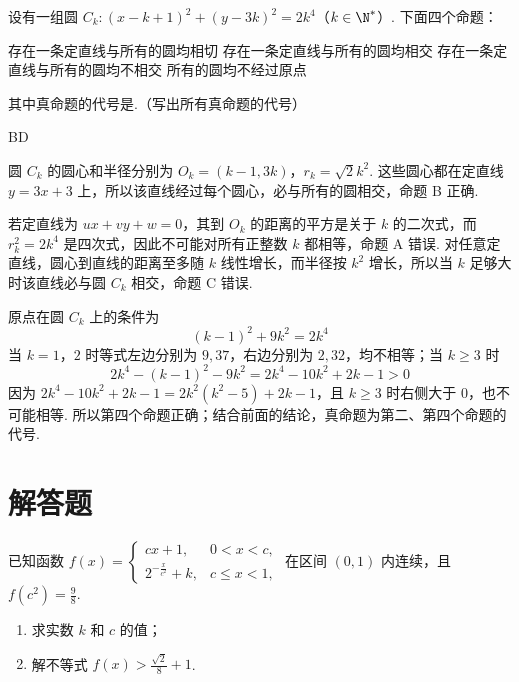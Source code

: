 \begin{problem}
设有一组圆 \(C_k: (x - k + 1)^{2} + (y - 3k)^{2} = 2k^{4}\)（\(k \in \N^*\)）. 下面四个命题：

\choices
    {存在一条定直线与所有的圆均相切}
    {存在一条定直线与所有的圆均相交}
    {存在一条定直线与所有的圆均不相交}
    {所有的圆均不经过原点}

其中真命题的代号是\fillinblank{}.（写出所有真命题的代号）
\end{problem}

\begin{answer}
BD
\end{answer}

\begin{solution}
圆 \(C_k\) 的圆心和半径分别为
\(O_k=(k-1,3k)\)，\(r_k=\sqrt2 k^2\).
这些圆心都在定直线 \(y=3x+3\) 上，所以该直线经过每个圆心，必与所有的圆相交，命题 B 正确.

若定直线为 \(ux+vy+w=0\)，其到 \(O_k\) 的距离的平方是关于 \(k\) 的二次式，而 \(r_k^2=2k^4\) 是四次式，因此不可能对所有正整数 \(k\) 都相等，命题 A 错误. 对任意定直线，圆心到直线的距离至多随 \(k\) 线性增长，而半径按 \(k^2\) 增长，所以当 \(k\) 足够大时该直线必与圆 \(C_k\) 相交，命题 C 错误.

原点在圆 \(C_k\) 上的条件为
\[
(k-1)^2+9k^2=2k^4
\]
当 \(k=1\)，\(2\) 时等式左边分别为 \(9,37\)，右边分别为 \(2,32\)，均不相等；当 \(k\geqslant3\) 时
\[
2k^4-(k-1)^2-9k^2=2k^4-10k^2+2k-1>0
\]
因为 \(2k^4-10k^2+2k-1=2k^2(k^2-5)+2k-1\)，且 \(k\geqslant3\) 时右侧大于 \(0\)，也不可能相等. 所以第四个命题正确；结合前面的结论，真命题为第二、第四个命题的代号.
\end{solution}

\section{解答题}

\begin{problem}
已知函数 \(f(x)=\begin{cases}
cx + 1, & 0 < x < c,\\
2^{-\frac{x}{c^{2}}} + k, & c \leqslant x < 1,
\end{cases}\) 在区间 \((0,1)\) 内连续，且 \(f(c^{2}) = \frac{9}{8}\).

\begin{enumerate}
\item 求实数 \(k\) 和 \(c\) 的值；
\item 解不等式 \(f(x) > \frac{\sqrt{2}}{8} + 1\).
\end{enumerate}
\end{problem}


